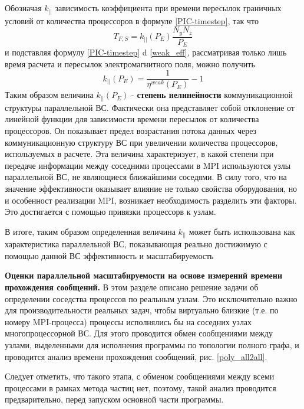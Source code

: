 Обозначая $k_{||}$ зависимость коэффициента при времени пересылок граничных условий от количества процессоров в формуле \ref{PIC-timestep}, так что 
\begin{equation}
T_{F,S} = k_{||} (P_E) \frac{N_y N_z}{P_E}
\end{equation} 
и подставляя формулу \ref{PIC-timestep} d \ref{weak_eff}, рассматривая только лишь время расчета и пересылок электромагнитного поля, можно получить 
\begin{equation}
k_{||} (P_E) = \frac{1}{\eta^{weak}(P_E)} - 1
\end{equation}	  
Таким образом величина $k_{||} (P_E)$  - \textbf{степень нелинейности} коммуникационной структуры параллельной ВС. Фактически она представляет собой отклонение от линейной функции для зависимости времени пересылок от количества процессоров. Он показывает предел возрастания потока данных через коммуникационную структуру ВС при увеличении количества процессоров, используемых в расчете. Эта величина характеризует, в какой степени при передаче информации между соседними процессами в MPI используются узлы параллельной ВС, не являющиеся ближайшими соседями. В силу того, что на значение эффективности оказывает влияние не только свойства оборудования, но и особенност реализации MPI, возникает необходимость разделить эти факторы. Это достигается с помощью привязки процессорв к узлам. 

В итоге, таким образом определенная  величина $k_{||} $ может быть использована как характеристика параллельной ВС, показывающая реально достижимую с помощью данной ВС эффективность и масштабируемость   

\textbf{Оценки параллельной масштабируемости на основе измерений времени прохождения сообщений.}
В этом разделе описано решение задачи об определении соседства процессов по реальным узлам. Это исключительно важно для производительности реальных задач, чтобы виртуально близкие (т.е. по номеру MPI-процесса) процессы исполнялись бы на соседних узлах многопроцессорной ВС. Для этого проводится обмен сообщениями между узлами, выделенными 
для исполнения программы по топологии полного графа, и проводится анализ времени прохождения сообщений, рис. \ref{poly_all2all}.  

Следует отметить, что такого этапа, с обменом сообщениями между всеми процессами в рамках метода частиц нет, поэтому, такой анализ проводится предварительно, перед запуском основной части программы.


